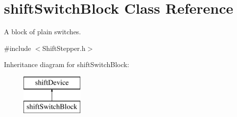 \hypertarget{classshift_switch_block}{
\section{shiftSwitchBlock Class Reference}
\label{classshift_switch_block}
}


A block of plain switches.  




{\ttfamily \#include $<$ShiftStepper.h$>$}

Inheritance diagram for shiftSwitchBlock:\begin{figure}[H]
\begin{center}
\leavevmode
\includegraphics[height=2.000000cm]{classshift_switch_block}
\end{center}
\end{figure}

